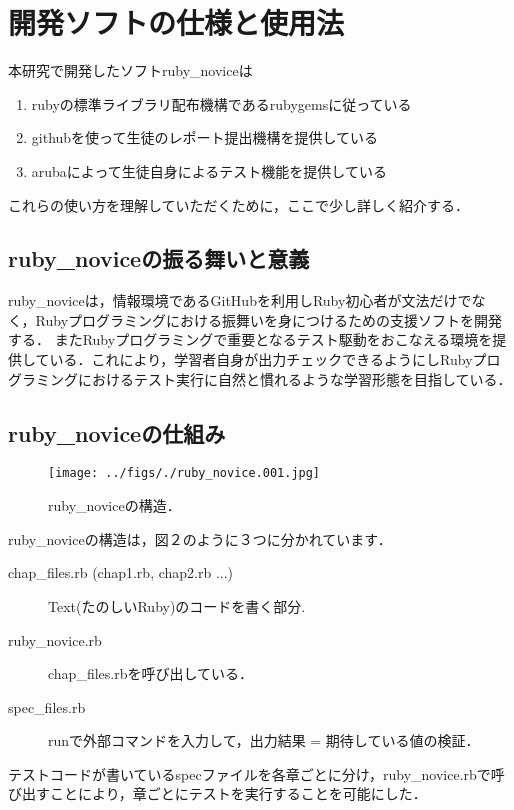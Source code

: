 
\section{開発ソフトの仕様と使用法}
本研究で開発したソフトruby\_noviceは

\begin{enumerate}
\item rubyの標準ライブラリ配布機構であるrubygemsに従っている
\item githubを使って生徒のレポート提出機構を提供している
\item arubaによって生徒自身によるテスト機能を提供している
\end{enumerate}
これらの使い方を理解していただくために，ここで少し詳しく紹介する．

\subsection{ruby\_noviceの振る舞いと意義}
ruby\_noviceは，情報環境であるGitHubを利用しRuby初心者が文法だけでなく，Rubyプログラミングにおける振舞いを身につけるための支援ソフトを開発する．
またRubyプログラミングで重要となるテスト駆動をおこなえる環境を提供している．これにより，学習者自身が出力チェックできるようにしRubyプログラミングにおけるテスト実行に自然と慣れるような学習形態を目指している．

\subsection{ruby\_noviceの仕組み}
\begin{figure}[htbp]\begin{center}
\texttt{[image: ../figs/./ruby\_novice.001.jpg]}
\caption{ruby\_noviceの構造．}
\label{default}\end{center}\end{figure}
ruby\_noviceの構造は，図２のように３つに分かれています．
\begin{description}
\item[chap\_files.rb (chap1.rb, chap2.rb ...)]  Text(たのしいRuby)のコードを書く部分.

\item[ruby\_novice.rb]   chap\_files.rbを呼び出している．

\item[spec\_files.rb]   runで外部コマンドを入力して，出力結果 = 期待している値の検証．

\end{description}
テストコードが書いているspecファイルを各章ごとに分け，ruby\_novice.rbで呼び出すことにより，章ごとにテストを実行することを可能にした．

